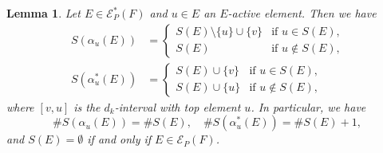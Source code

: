 \documentclass[10pt]{amsart}
\newtheorem{lemm}[theo]{Lemma}
\theoremstyle{definition}
\theoremstyle{remark}
\newcommand\EE{\mathcal{E}}
\begin{document}
\begin{lemm}
\label{lem:SE1}
Let $E \in \EE^*_P(F)$ and $u \in E$ an $E$-active element.
Then we have
\begin{align}
\label{eq:SE11}
S(\alpha_u(E))
 &=
\begin{cases}
 S(E) \setminus \{ u \} \cup \{ v \} &\text{if $u \in S(E)$,} \\
 S(E) &\text{if $u \not\in S(E)$,}
\end{cases}
\\
\label{eq:SE12}
S(\alpha^*_u(E))
 &=
\begin{cases}
 S(E) \cup \{ v \} &\text{if $u \in S(E)$,} \\
 S(E) \cup \{ u \} &\text{if $u \not\in S(E)$,}
\end{cases}
\end{align}
where $[v,u]$ is the $d_k$-interval with top element $u$.
In particular, we have
$$
\# S(\alpha_u(E)) = \# S(E),
\quad
\# S(\alpha^*_u(E)) = \# S(E) + 1,
$$
and $S(E) = \emptyset$ if and only if $E \in \EE_P(F)$.
\end{lemm}
\end{document}
